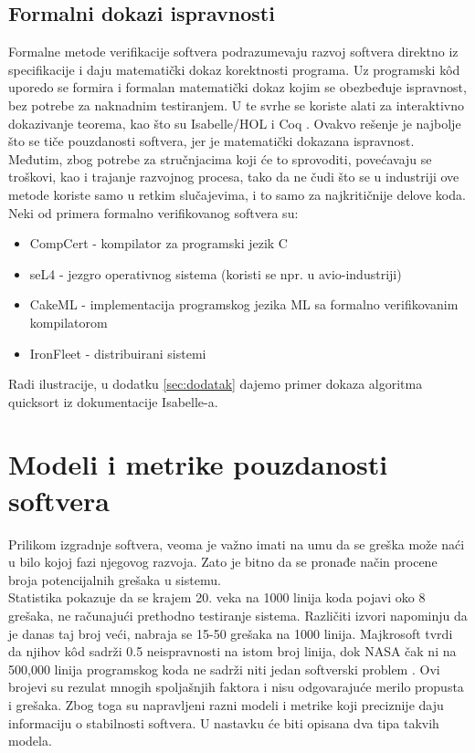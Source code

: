 \documentclass[a4paper]{article}
\begin{document}
\subsection{Formalni dokazi ispravnosti}
\label{subsec:formalni_dokazi}
Formalne metode verifikacije softvera podrazumevaju razvoj softvera direktno iz specifikacije i daju matematički dokaz korektnosti programa.
Uz programski k\^{o}d uporedo se formira i formalan matematički dokaz kojim se obezbeđuje ispravnost, bez potrebe za naknadnim testiranjem.
U te svrhe se koriste alati za interaktivno dokazivanje teorema, kao što su Isabelle/HOL \cite{isabelle} i Coq \cite{coq}.
Ovakvo rešenje je najbolje što se tiče pouzdanosti softvera, jer je matematički dokazana ispravnost.
Međutim, zbog potrebe za stručnjacima koji će to sprovoditi, povećavaju se troškovi, kao i trajanje razvojnog procesa, tako da ne čudi što se u industriji ove metode koriste samo u retkim slučajevima, i to samo za najkritičnije delove koda.\\
Neki od primera formalno verifikovanog softvera su:
\begin{itemize}
\item CompCert - kompilator za programski jezik C \cite{compcert}
\item seL4 - jezgro operativnog sistema (koristi se npr. u avio-industriji) \cite{sel4}
\item CakeML - implementacija programskog jezika ML sa formalno verifikovanim kompilatorom \cite{cakeml}
\item IronFleet - distribuirani sistemi \cite{ironfleet}
\end{itemize}

Radi ilustracije, u dodatku \ref{sec:dodatak} dajemo primer dokaza algoritma quicksort iz dokumentacije Isabelle-a.


\section{Modeli i metrike pouzdanosti softvera}	
\label{sec:modeli_metrike}

Prilikom izgradnje softvera, veoma je važno imati na umu da se greška može naći u bilo kojoj fazi njegovog razvoja. Zato je bitno da se pronađe način procene broja potencijalnih grešaka u sistemu.\\
Statistika pokazuje da se krajem 20. veka na 1000 linija koda pojavi oko 8 grešaka, ne računajući prethodno testiranje sistema. Različiti izvori napominju da je danas taj broj veći, nabraja se 15-50 grešaka na 1000 linija. Majkrosoft tvrdi da njihov k\^{o}d sadrži 0.5 neispravnosti na istom broj linija, dok NASA čak ni na 500,000 linija programskog koda ne sadrži niti jedan softverski problem \cite{Statistika_prosek_gresaka}. Ovi brojevi su rezulat mnogih spoljašnjih faktora i nisu odgovarajuće merilo propusta i grešaka. Zbog toga su napravljeni razni modeli i metrike koji preciznije daju informaciju o stabilnosti softvera. U nastavku će biti opisana dva tipa takvih modela.\\
\end{document}
